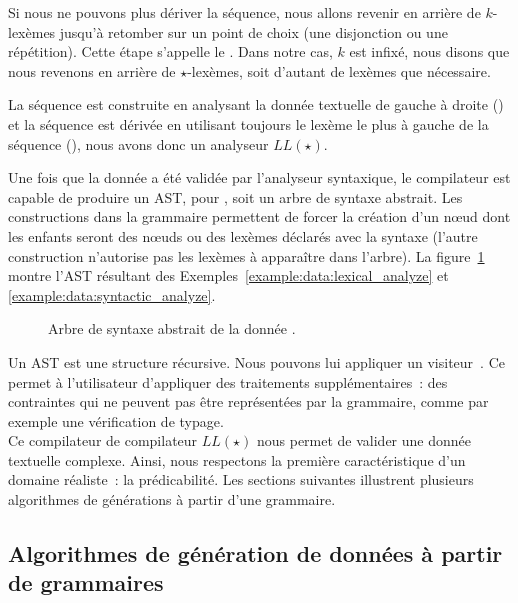 Si nous ne pouvons plus dériver la séquence, nous allons revenir en arrière de
$k$-lexèmes jusqu'à retomber sur un point de choix (une disjonction ou une
répétition). Cette étape s'appelle le . Dans notre cas,
$k$ est infixé, nous disons que nous revenons en arrière de $\star$-lexèmes,
soit d'autant de lexèmes que nécessaire.

La séquence est construite en analysant la donnée textuelle de gauche à droite
() et la séquence est dérivée en utilisant
toujours le lexème le plus à gauche de la séquence (), nous avons donc un analyseur $LL(\star)$.

Une fois que la donnée a été validée par l'analyseur syntaxique, le compilateur
est capable de produire un AST, pour , soit un
arbre de syntaxe abstrait. Les constructions  dans la grammaire
permettent de forcer la création d'un nœud dont les enfants seront des nœuds ou
des lexèmes déclarés avec la syntaxe  (l'autre construction
 n'autorise pas les lexèmes à apparaître dans l'arbre). La
figure~\ref{figure:data:ast} montre l'AST résultant des
Exemples~\ref{example:data:lexical_analyze} et
\ref{example:data:syntactic_analyze}.
%
\begin{figure}


\caption{\label{figure:data:ast} Arbre de syntaxe abstrait de la donnée .}

\end{figure}
%
Un AST est une structure récursive. Nous pouvons lui appliquer un {\strong
visiteur}~. Ce  permet à
l'utilisateur d'appliquer des traitements supplémentaires~: des contraintes qui
ne peuvent pas être représentées par la grammaire, comme par exemple une
vérification de typage. \\

Ce compilateur de compilateur $LL(\star)$ nous permet de valider une donnée
textuelle complexe. Ainsi, nous respectons la première caractéristique d'un
domaine réaliste~: la prédicabilité. Les sections suivantes illustrent plusieurs
algorithmes de générations à partir d'une grammaire.

\subsection{Algorithmes de génération de données à partir de grammaires}
\label{subsection:data:algorithms}

